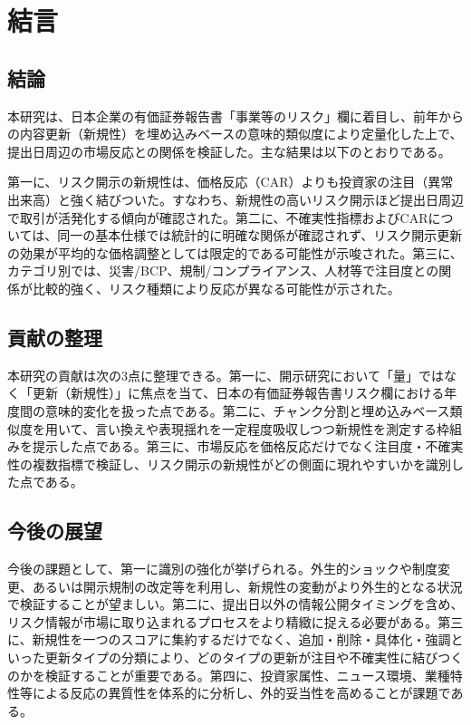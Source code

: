 \chapter{結言}

\section{結論}
本研究は、日本企業の有価証券報告書「事業等のリスク」欄に着目し、前年からの内容更新（新規性）を埋め込みベースの意味的類似度により定量化した上で、提出日周辺の市場反応との関係を検証した。主な結果は以下のとおりである。

第一に、リスク開示の新規性は、価格反応（CAR）よりも投資家の注目（異常出来高）と強く結びついた。すなわち、新規性の高いリスク開示ほど提出日周辺で取引が活発化する傾向が確認された。第二に、不確実性指標およびCARについては、同一の基本仕様では統計的に明確な関係が確認されず、リスク開示更新の効果が平均的な価格調整としては限定的である可能性が示唆された。第三に、カテゴリ別では、災害/BCP、規制/コンプライアンス、人材等で注目度との関係が比較的強く、リスク種類により反応が異なる可能性が示された。

\section{貢献の整理}
本研究の貢献は次の3点に整理できる。第一に、開示研究において「量」ではなく「更新（新規性）」に焦点を当て、日本の有価証券報告書リスク欄における年度間の意味的変化を扱った点である。第二に、チャンク分割と埋め込みベース類似度を用いて、言い換えや表現揺れを一定程度吸収しつつ新規性を測定する枠組みを提示した点である。第三に、市場反応を価格反応だけでなく注目度・不確実性の複数指標で検証し、リスク開示の新規性がどの側面に現れやすいかを識別した点である。

\section{今後の展望}
今後の課題として、第一に識別の強化が挙げられる。外生的ショックや制度変更、あるいは開示規制の改定等を利用し、新規性の変動がより外生的となる状況で検証することが望ましい。第二に、提出日以外の情報公開タイミングを含め、リスク情報が市場に取り込まれるプロセスをより精緻に捉える必要がある。第三に、新規性を一つのスコアに集約するだけでなく、追加・削除・具体化・強調といった更新タイプの分類により、どのタイプの更新が注目や不確実性に結びつくのかを検証することが重要である。第四に、投資家属性、ニュース環境、業種特性等による反応の異質性を体系的に分析し、外的妥当性を高めることが課題である。


